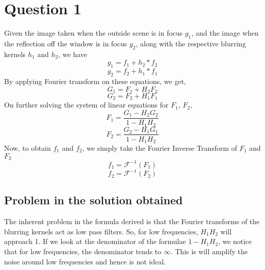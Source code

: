 \documentclass[12pt, a4paper]{article}
\begin{document}
\vspace*{-22pt}
\section*{Question 1}
\quad Given the image taken when the outside scene is in focus $g_1$, and the image when the reflection off the window is in focus $g_2$, along with the respective blurring kernels $h_1$ and $h_2$, we have \\
$$g_1 = f_1 + h_2*f_2$$
$$g_2 = f_2 + h_1*f_1$$
By applying Fourier transform on these equations, we get,
$$G_1 = F_1 + H_2F_2$$
$$G_2 = F_2 + H_1F_1$$
On further solving the system of linear equations for $F_1$, $F_2$,
$$F_1 = \frac{G_1 - H_2G_2}{1-H_1H_2}$$
$$F_2 = \frac{G_2 - H_1G_1}{1-H_1H_2}$$
Now, to obtain $f_1$ and $f_2$, we simply take the Fourier Inverse Transform of $F_1$ and $F_2$
$$\boxed{f_1 = \mathcal{F}^{-1}(F_1)}$$
$$\boxed{f_2 = \mathcal{F}^{-1}(F_2)}$$

\subsection*{Problem in the solution obtained}
The inherent problem in the formula derived is that the Fourier transforms of the blurring kernels act as low pass filters. So, for low frequencies, $H_1H_2$ will approach 1. If we look at the denominator of the formulae $1 - H_1H_2$, we notice that for low frequencies, the denominator tends to $\infty$. This is will amplify the noise around low frequencies and hence is not ideal.
\end{document}
